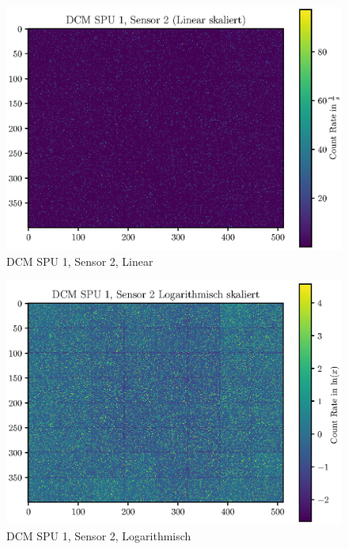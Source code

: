 \documentclass[12pt,twoside,a4paper]{scrartcl}
\begin{document}
			\begin{figure}[H]
				\includegraphics[width = \textwidth]{Plots/DCM/DCM_SPU1_Sensor2_lin.eps}
				\caption{DCM SPU 1, Sensor 2, Linear}
			\end{figure}

			\begin{figure}[H]
				\includegraphics[width = \textwidth]{Plots/DCM/DCM_SPU1_Sensor2_log.eps}
				\caption{DCM SPU 1, Sensor 2, Logarithmisch}
			\end{figure}
\end{document}
